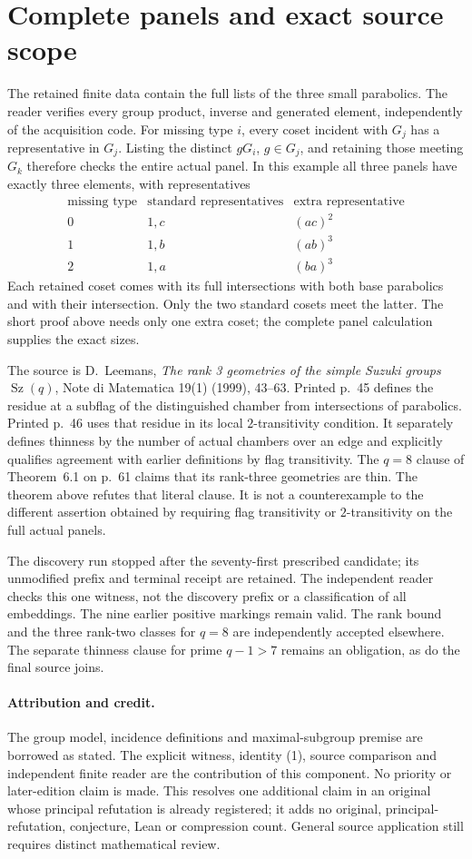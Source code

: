 \documentclass[11pt,a4paper]{article}
\newcommand{\Sz}{\operatorname{Sz}}
\begin{document}
\section{Complete panels and exact source scope}
The retained finite data contain the full lists of the three small
parabolics. The reader verifies every group product, inverse and generated
element, independently of the acquisition code. For missing type $i$,
every coset incident with $G_j$ has a representative in $G_j$.
Listing the distinct $gG_i$, $g\in G_j$, and retaining those meeting
$G_k$ therefore checks the entire actual panel. In this example all
three panels have exactly three elements, with representatives
\[
\begin{array}{c|c|c}
\text{missing type}&\text{standard representatives}&\text{extra representative}\\\hline
0&1,c&(ac)^2\\
1&1,b&(ab)^3\\
2&1,a&(ba)^3
\end{array}
\]
Each retained coset comes with its full intersections with both base
parabolics and with their intersection. Only the two standard cosets
meet the latter. The short proof above needs only one extra coset;
the complete panel calculation supplies the exact sizes.

The source is D.~Leemans, \emph{The rank 3 geometries of the simple
Suzuki groups $\Sz(q)$}, Note di Matematica 19(1) (1999), 43--63.
Printed p.~45 defines the residue at a subflag of the distinguished
chamber from intersections of parabolics. Printed p.~46 uses that
residue in its local $2$-transitivity condition. It separately defines
thinness by the number of actual chambers over an edge and explicitly
qualifies agreement with earlier definitions by flag transitivity.
The $q=8$ clause of Theorem~6.1 on p.~61 claims that its rank-three
geometries are thin. The theorem above refutes that literal clause.
It is not a counterexample to the different assertion obtained by
requiring flag transitivity or $2$-transitivity on the full actual panels.

The discovery run stopped after the seventy-first prescribed candidate;
its unmodified prefix and terminal receipt are retained. The independent
reader checks this one witness, not the discovery prefix or a classification
of all embeddings. The nine earlier positive markings remain valid.
The rank bound and the three rank-two classes for $q=8$ are independently
accepted elsewhere. The separate thinness clause for prime $q-1>7$
remains an obligation, as do the final source joins.

\paragraph{Attribution and credit.}
The group model, incidence definitions and maximal-subgroup premise are
borrowed as stated. The explicit witness, identity (1), source comparison
and independent finite reader are the contribution of this component.
No priority or later-edition claim is made. This resolves one additional
claim in an original whose principal refutation is already registered;
it adds no original, principal-refutation, conjecture, Lean or compression
count. General source application still requires distinct mathematical review.
\end{document}
